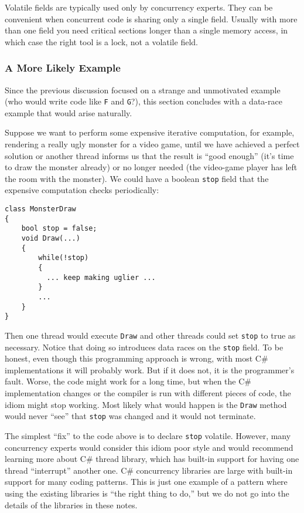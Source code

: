 \documentclass[10pt]{article}
\begin{document}
Volatile fields are typically used only by concurrency experts.  They
can be convenient when concurrent code is sharing only a single
field.  Usually with more than one field you need critical sections
longer than a single memory access, in which case the right tool is a
lock, not a volatile field.

\subsubsection{A More Likely Example}

Since the previous discussion focused on a strange and unmotivated
example (who would write code like {\tt F} and {\tt G}?), this section
concludes with a data-race example that would arise naturally.

Suppose we want to perform some expensive iterative computation, for
example, rendering a really ugly monster for a video game, until we
have achieved a perfect solution or another thread informs us that the
result is ``good enough'' (it's time to draw the monster already) or
no longer needed (the video-game player has left the room with the
monster).  We could have a boolean {\tt stop} field that the expensive
computation checks periodically:
\begin{verbatim}
class MonsterDraw
{
    bool stop = false;
    void Draw(...)
    {
        while(!stop)
        {
          ... keep making uglier ...
        }
        ...
    }
}
\end{verbatim}
Then one thread would execute {\tt Draw} and other threads could set
{\tt stop} to true as necessary.  Notice that doing so introduces data
races on the {\tt stop} field.  To be honest, even though this
programming approach is wrong, with most C\# implementations it will
probably work.  But if it does not, it is the programmer's fault.
Worse, the code might work for a long time, but when the C\#
implementation changes or the compiler is run with different pieces of
code, the idiom might stop working.  Most likely what would happen is
the {\tt Draw} method would never ``see'' that {\tt stop} was changed
and it would not terminate.

The simplest ``fix'' to the code above is to declare {\tt stop}
volatile.  However, many concurrency experts would consider this idiom
poor style and would recommend learning more about C\# thread library, 
which has built-in support for having one thread
``interrupt'' another one.  C\# concurrency libraries are large
with built-in support for many coding patterns.  This is just one
example of a pattern where using the existing libraries is ``the right
thing to do,'' but we do not go into the details of the libraries in
these notes.
\end{document}
